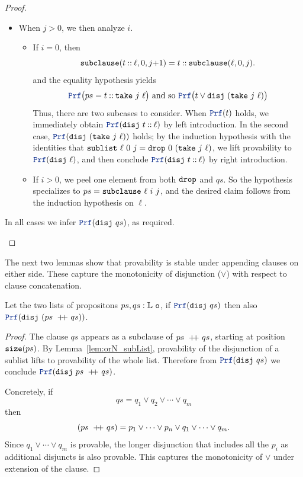 \begin{lemma}
\begin{proof}
\begin{itemize}
\begin{itemize}
      \item When $j > 0$, we then analyze $i$.
        \begin{itemize}
          \item If $i=0$, then
            \[
              \texttt{\upshape{subclause}}(t \mathbin{::} \ell,0,j{+}1)= t \mathbin{::} \texttt{\upshape{subclause}}(\ell,0,j).
            \]
            and the equality hypothesis yields
            \[
              \prf \bigl( ps = t \cons \kw{take}~j~\ell \bigr)
              \text{ and so } \prf \bigl( t \lor \kw{disj}~(\kw{take}~j~\ell) \bigr)
            \]
            Thus, there are two subcases to consider.
            When $\prf(t)$ holds, we immediately obtain $\prf(\kw{disj}~t \cons \ell)$ by left introduction.
            In the second case, $\prf(\kw{disj}~(\kw{take}~j~\ell))$ holds; by the induction hypothesis with the identities that $\texttt{\upshape{sublist}}~\ell~0~j = \texttt{\upshape{drop}}~0~(\texttt{\upshape{take}}~j~\ell)$,
            we lift provability to $\prf(\kw{disj}~\ell)$, and then conclude $\prf(\kw{disj}~t \cons \ell)$ by right introduction.
          \item If $i > 0$, we peel one element from both $\texttt{\upshape{drop}}$ and $qs$.
            So the hypothesis specializes to $ps=\texttt{\upshape{subclause}}~\ell~i~j$, and the desired claim follows from the induction hypothesis on $\ell$.
          \end{itemize}
    \end{itemize}
  In all cases we infer $\prf(\kw{disj}~qs)$, as required.
\end{itemize}
\end{proof}
\end{lemma}

The next two lemmas show that provability is stable under appending clauses on either side.
These capture the monotonicity of disjunction ($\lor$) with respect to clause concatenation.

\begin{lemma}\label{lem:orN_append_right}
Let the two lists of propositons $ps,qs: \mathbb{L}~\texttt{o}$, if $\prf(\kw{disj}~qs)$ then also $\prf(\kw{disj}~(ps \concat qs))$.
\begin{proof}
The clause $qs$ appears as a subclause of $ps ~+\!\!\!+~ qs$, starting at position $\texttt{\upshape{size}}(ps)$.
By Lemma~\ref{lem:orN_subList}, provability of the disjunction of a sublist lifts to provability of the whole list.
Therefore from $\prf(\kw{disj}~qs)$ we conclude $\prf(\kw{disj}~ps \concat qs)$.

Concretely, if
\[
  qs = q_1 \lor q_2 \lor \cdots \lor q_m
\]
then
\[
  (ps ~+\!\!\!+~ qs) = p_1 \lor \cdots \lor p_n \lor q_1 \lor \cdots \lor q_m.
\]
Since $q_1 \lor \cdots \lor q_m$ is provable, the longer disjunction that includes all the $p_i$ as additional disjuncts is also provable.
This captures the monotonicity of $\lor$ under extension of the clause.
\end{proof}
\end{lemma}

